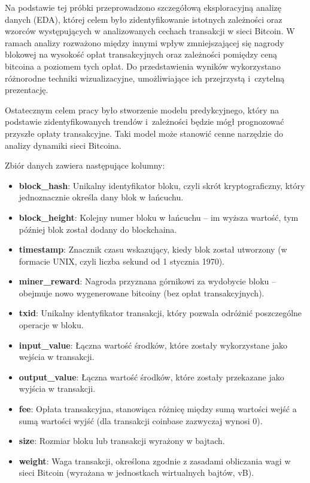 \documentclass[12pt,a4paper]{report}
\theoremstyle{definition} %
\begin{document}
	\hspace*{\parindent}Na podstawie tej próbki przeprowadzono szczegółową eksploracyjną analizę danych (EDA), której celem było zidentyfikowanie istotnych zależności oraz wzorców występujących w analizowanych cechach transakcji w sieci Bitcoin. W ramach analizy rozważono między innymi wpływ zmniejszającej się nagrody blokowej na wysokość opłat transakcyjnych oraz zależności  pomiędzy ceną bitcoina a poziomem tych opłat. Do przedstawienia wyników wykorzystano różnorodne techniki wizualizacyjne, umożliwiające ich przejrzystą i~czytelną prezentację.

	Ostatecznym celem pracy było stworzenie modelu predykcyjnego, który na podstawie zidentyfikowanych trendów i~zależności będzie mógł prognozować przyszłe opłaty transakcyjne. Taki model może stanowić cenne narzędzie do analizy dynamiki sieci Bitcoina.

	Zbiór danych zawiera następujące kolumny:
	\begin{itemize}
	    \item \textbf{block\_hash}: Unikalny identyfikator bloku, czyli skrót kryptograficzny, który jednoznacznie określa dany blok w łańcuchu.
	    \item \textbf{block\_height}: Kolejny numer bloku w łańcuchu – im wyższa wartość, tym później blok został dodany do blockchaina.
	    \item \textbf{timestamp}: Znacznik czasu wskazujący, kiedy blok został utworzony (w formacie UNIX, czyli liczba sekund od 1 stycznia 1970).
	    \item \textbf{miner\_reward}: Nagroda przyznana górnikowi za wydobycie bloku – obejmuje nowo wygenerowane bitcoiny (bez opłat transakcyjnych).
	    \item \textbf{txid}: Unikalny identyfikator transakcji, który pozwala odróżnić poszczególne operacje w bloku.
	    \item \textbf{input\_value}: Łączna wartość środków, które zostały wykorzystane jako wejścia w transakcji.
	    \item \textbf{output\_value}: Łączna wartość środków, które zostały przekazane jako wyjścia w transakcji.
	    \item \textbf{fee}: Opłata transakcyjna, stanowiąca różnicę między sumą wartości wejść a sumą wartości wyjść (dla transakcji coinbase zazwyczaj wynosi 0).
	    \item \textbf{size}: Rozmiar bloku lub transakcji wyrażony w bajtach.
	    \item \textbf{weight}: Waga transakcji, określona zgodnie z zasadami obliczania wagi w sieci Bitcoin (wyrażana w jednostkach wirtualnych bajtów, vB).
	\end{itemize}
\end{document}
